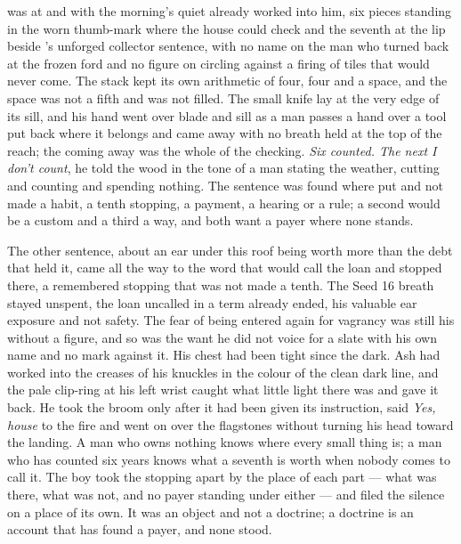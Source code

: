  was at  and  with the morning's quiet already worked into him, six pieces standing in the worn thumb-mark where the house could check and the seventh at the lip beside 's unforged collector sentence, with no name on the man who turned back at the frozen ford and no figure on  circling against a firing of tiles that would never come. The stack kept its own arithmetic of four, four and a space, and the space was not a fifth and was not filled. The small knife lay at the very edge of its sill, and his hand went over blade and sill as a man passes a hand over a tool put back where it belongs and came away with no breath held at the top of the reach; the coming away was the whole of the checking. \emph{Six counted. The next I don't count}, he told the wood in the tone of a man stating the weather, cutting and counting and spending nothing. The sentence was found where put and not made a habit, a tenth stopping, a payment, a hearing or a rule; a second would be a custom and a third a way, and both want a payer where none stands.

The other sentence, about an ear under this roof being worth more than the debt that held it, came all the way to the word that would call the loan and stopped there, a remembered stopping that was not made a tenth. The Seed 16 breath stayed unspent, the loan uncalled in a term already ended, his valuable ear exposure and not safety. The fear of being entered again for vagrancy was still his without a figure, and so was the want he did not voice for a slate with his own name and no mark against it. His chest had been tight since the dark. Ash had worked into the creases of his knuckles in the colour of the clean dark line, and the pale clip-ring at his left wrist caught what little light there was and gave it back. He took the broom only after it had been given its instruction, said \emph{Yes, house} to the fire and went on over the flagstones without turning his head toward the landing. A man who owns nothing knows where every small thing is; a man who has counted six years knows what a seventh is worth when nobody comes to call it. The boy took the stopping apart by the place of each part --- what was there, what was not, and no payer standing under either --- and filed the silence on a place of its own. It was an object and not a doctrine; a doctrine is an account that has found a payer, and none stood.

